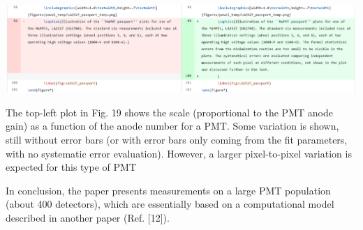 \documentclass[11pt]{report}
\begin{document}
\includegraphics[width=\linewidth]{round1/2.09a.png}



\begin{tcolorbox}[enlarge top by=2em,colbacktitle=black!60!white,colframe=black!80!white,left=0pt,right=0pt,top=0pt,bottom=0pt,boxrule=0.3pt,title=\bfseries2.09b]
The top-left plot in Fig. 19 shows the scale (proportional to the PMT anode gain) as a function of the anode number for a PMT. Some variation is shown, still without error bars (or with error bars only coming from the fit parameters, with no systematic error evaluation). However, a larger pixel-to-pixel variation is expected for this type of PMT
\end{tcolorbox}






\begin{tcolorbox}[enlarge top by=2em,colbacktitle=blue!60!white,colframe=black!80!white,left=0pt,right=0pt,top=0pt,bottom=0pt,boxrule=0.3pt,title=\bfseries2.10]
In conclusion, the paper presents measurements on a large PMT population (about 400 detectors), which are essentially based on a computational model described in another paper (Ref. [12]).
\end{tcolorbox}
\end{document}
